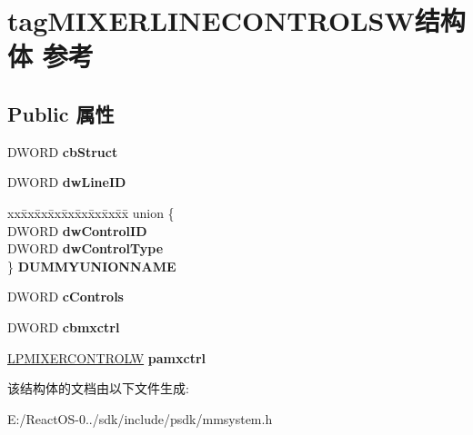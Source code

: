 \hypertarget{structtag_m_i_x_e_r_l_i_n_e_c_o_n_t_r_o_l_s_w}{}\section{tag\+M\+I\+X\+E\+R\+L\+I\+N\+E\+C\+O\+N\+T\+R\+O\+L\+S\+W结构体 参考}
\label{structtag_m_i_x_e_r_l_i_n_e_c_o_n_t_r_o_l_s_w}
\subsection*{Public 属性}
\begin{DoxyCompactItemize}
\item 
\mbox{\label{structtag_m_i_x_e_r_l_i_n_e_c_o_n_t_r_o_l_s_w_a7696f6ed10fd5e4cd6f1f2851a90245a}} 
D\+W\+O\+RD {\bfseries cb\+Struct}
\item 
\mbox{\label{structtag_m_i_x_e_r_l_i_n_e_c_o_n_t_r_o_l_s_w_a7fb295fbd3ddb6648a02c2c84f0cba07}} 
D\+W\+O\+RD {\bfseries dw\+Line\+ID}
\item 
\mbox{\label{structtag_m_i_x_e_r_l_i_n_e_c_o_n_t_r_o_l_s_w_aa07e463019fd097c98f7afc890bb82cf}} 
\begin{tabbing}
xx\=xx\=xx\=xx\=xx\=xx\=xx\=xx\=xx\=\kill
union \{\\
\>DWORD {\bfseries dwControlID}\\
\>DWORD {\bfseries dwControlType}\\
\} {\bfseries DUMMYUNIONNAME}\\

\end{tabbing}\item 
\mbox{\label{structtag_m_i_x_e_r_l_i_n_e_c_o_n_t_r_o_l_s_w_a779b619aefbf5cb710b64edaa9b13142}} 
D\+W\+O\+RD {\bfseries c\+Controls}
\item 
\mbox{\label{structtag_m_i_x_e_r_l_i_n_e_c_o_n_t_r_o_l_s_w_a8394e5f24b1362caf6e8ca62423442b5}} 
D\+W\+O\+RD {\bfseries cbmxctrl}
\item 
\mbox{\label{structtag_m_i_x_e_r_l_i_n_e_c_o_n_t_r_o_l_s_w_adc3baf0df654d09db44162fa4a4cf624}} 
\hyperlink{structtag_m_i_x_e_r_c_o_n_t_r_o_l_w}{L\+P\+M\+I\+X\+E\+R\+C\+O\+N\+T\+R\+O\+LW} {\bfseries pamxctrl}
\end{DoxyCompactItemize}


该结构体的文档由以下文件生成\+:\begin{DoxyCompactItemize}
\item 
E\+:/\+React\+O\+S-\/0../sdk/include/psdk/mmsystem.\+h\end{DoxyCompactItemize}
